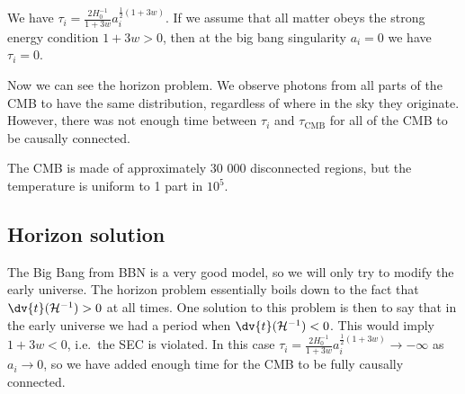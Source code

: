 \documentclass{jknotes}
\begin{document}
We have \(\tau_i = \frac{2H_0^{-1}}{1+3w}a_i^{\frac12(1+3w)}\). If we assume that all matter obeys the strong energy condition \(1+3w>0\), then at the big bang singularity \(a_i=0\) we have \(\tau_i=0\).

Now we can see the horizon problem. We observe photons from all parts of the CMB to have the same distribution, regardless of where in the sky they originate. However, there was not enough time between \(\tau_i\) and \(\tau_{\text{CMB}}\) for all of the CMB to be causally connected.

\begin{figure}[H]
    \centering
\end{figure}

The CMB is made of approximately 30 000 disconnected regions, but the temperature is uniform to 1 part in \(10^5\).

\subsection{Horizon solution}

The Big Bang from BBN is a very good model, so we will only try to modify the early universe. The horizon problem essentially boils down to the fact that \(\dv{t}(\mathcal{H}^{-1})>0\) at all times. One solution to this problem is then to say that in the early universe we had a period when \(\dv{t}(\mathcal{H}^{-1})<0\). This would imply \(1+3w<0\), i.e.\ the SEC is violated. In this case \(\tau_i = \frac{2H_0^{-1}}{1+3w}a_i^{\frac12(1+3w)} \to -\infty\) as \(a_i \to 0\), so we have added enough time for the CMB to be fully causally connected.

\begin{figure}[H]
    \centering
\end{figure}
\end{document}
